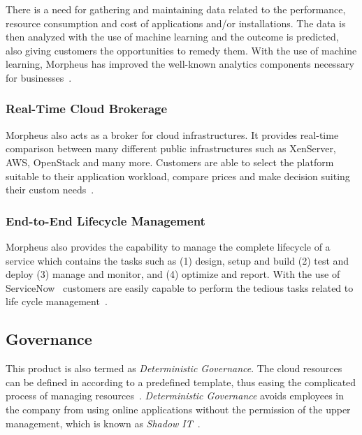 There is a need for gathering and maintaining data related to the performance, 
resource consumption and cost of applications and/or installations. The data is 
then analyzed with the use of machine learning and the outcome is predicted, 
also giving customers the opportunities to remedy them. With the use of machine 
learning, Morpheus has improved the well-known analytics components necessary 
for businesses~\cite{hid-sp18-416-www-morpheus-analytics}. 

\subsubsection{Real-Time Cloud Brokerage}

Morpheus also acts as a broker for cloud infrastructures. It provides real-time 
comparison between many different public infrastructures such as XenServer, 
AWS, OpenStack and many more. Customers are able to select the platform 
suitable to their application workload, compare prices and make decision 
suiting their custom needs~\cite{hid-sp18-416-www-morpheus-analytics}. 

\subsubsection{End-to-End Lifecycle Management}

Morpheus also provides the capability to manage the complete lifecycle of a 
service which contains the tasks such as (1) design, setup and build (2) test 
and deploy (3) manage and monitor, and (4) optimize and report. With the use of 
ServiceNow~\cite{hid-sp18-416-www-servicenow} customers are easily capable to 
perform the tedious tasks related to life cycle 
management~\cite{hid-sp18-416-www-morpheus-analytics}.

\subsection{Governance}

This product is also termed as \textit{Deterministic Governance}. The cloud 
resources can be defined in according to a predefined template, thus easing the 
complicated process of managing 
resources~\cite{hid-sp18-416-www-morpheus-product-guide}. \textit{Deterministic 
Governance} avoids employees in the company from using online applications 
without the permission of the upper management, which is known as 
\textit{Shadow IT}~\cite{hid-sp18-416-www-shadowit-wikipedia}.

